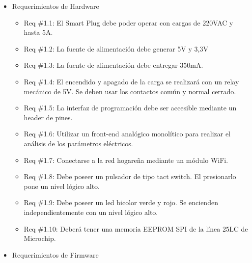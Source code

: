 \begin{itemize}
\item Requerimientos de Hardware

\begin{itemize}
\item Req \#1.1: El Smart Plug debe poder operar con cargas de 220VAC y hasta 5A.
\item Req \#1.2: La fuente de alimentación debe generar 5V y 3,3V
\item Req \#1.3: La fuente de alimentación debe entregar 350mA.
\item Req \#1.4: El encendido y apagado de la carga se realizará con un relay mecánico de 5V. Se deben usar los contactos común y normal cerrado.
\item Req \#1.5: La interfaz de programación debe ser accesible mediante un header de pines.
\item Req \#1.6: Utilizar un front-end analógico monolítico para realizar el análisis de los parámetros eléctricos.
\item Req \#1.7: Conectarse a la red hogareña mediante un módulo WiFi.
\item Req \#1.8: Debe poseer un pulsador de tipo tact switch. El presionarlo pone un nivel lógico alto.
\item Req \#1.9: Debe poseer un led bicolor verde y rojo. Se encienden independientemente con un nivel lógico alto.
\item Req \#1.10: Deberá tener una memoria EEPROM SPI de la línea 25LC de Microchip.
\end{itemize}

\item Requerimientos de Firmware


\end{itemize}
